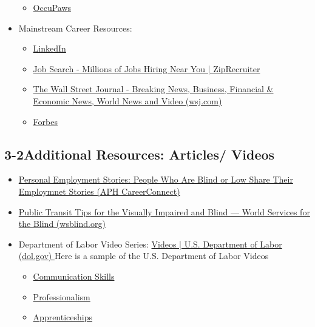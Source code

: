 \begin{itemize}[leftmargin=1.0cm]
\begin{itemize}
		      \item \href{https://occupaws.org/}{OccuPaws}
	      \end{itemize}
	\item Mainstream Career Resources:
	      \begin{itemize}
		      \item \href{https://www.linkedin.com/check/add-phone?country_code=us}{LinkedIn}
		      \item \href{https://www.ziprecruiter.com/search-jobs?tsid=101050007&utm_source=dgljs|bing-search|cmp-396131150|adg-1254543268869339|kw-kwd-78409208661568:loc-190|mt-e|device-c|cr-78409109849992|uid-08a564f52ea21ef2af2d06534b6fc1dc&utm_medium=cpc&msclkid=08a564f52ea21ef2af2d06534b6fc1dc}{Job Search - Millions of Jobs Hiring Near You | ZipRecruiter}
		      \item \href{https://www.wsj.com/}{The Wall Street Journal - Breaking News, Business, Financial \& Economic News, World News and Video (wsj.com)}
		      \item \href{https://www.forbes.com/?sh=36ffc04c2254}{Forbes}
	      \end{itemize}\end{itemize}
\pagebreak \subsection*{3-2\quad Additional Resources: Articles/ Videos}
\begin{itemize}[leftmargin=1.0cm]
	\item \href{https://aphcareerconnect.org/succeed-at-work/our-stories/}{Personal Employment Stories: People Who Are Blind or Low Share Their Employmnet Stories (APH CareerConnect)}
	\item \href{https://www.wsblind.org/blog/2020/8/20/public-transportation-tips-for-the-blind-and-visually-impaired}{Public Transit Tips for the Visually Impaired and Blind — World Services for the Blind (wsblind.org)}
	\item Department of Labor Video Series: \href{https://www.dol.gov/agencies/odep/program-areas/individuals/youth/transition/soft-skills/videos}{Videos | U.S. Department of Labor (dol.gov) }
	      Here is a sample of the U.S. Department of Labor Videos
	      \begin{itemize}
		      \item \href{https://www.youtube.com/watch?v=X0voPlW2pSs}{Communication Skills}
		      \item \href{https://www.youtube.com/watch?v=7dPWVjQSad4}{Professionalism }
		      \item \href{https://www.youtube.com/watch?v=OyLlS_XF9to}{Apprenticeships}
	      \end{itemize}\end{itemize}